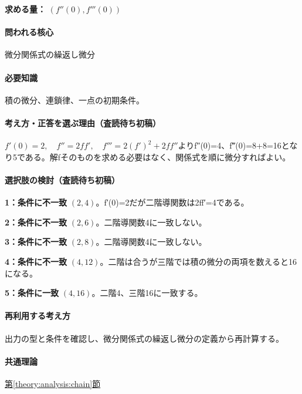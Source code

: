 \noindent\textbf{求める量：} \((f''(0),f'''(0))\)\par

\paragraph{問われる核心} 微分関係式の繰返し微分

\paragraph{必要知識} 積の微分、連鎖律、一点の初期条件。

\paragraph{考え方・正答を選ぶ理由（査読待ち初稿）} \(f'(0)=2,\quad f''=2ff',\quad f'''=2(f')^2+2ff''\)よりf″(0)=\allowbreak{}4、f‴(0)=\allowbreak{}8+8=\allowbreak{}16となり5である。解fそのものを求める必要はなく、関係式を順に微分すればよい。

\paragraph{選択肢の検討（査読待ち初稿）}\mbox{}\par

\noindent\textbf{1：条件に不一致} \((2,4)\)。f′(0)=\allowbreak{}2だが二階導関数は2ff′=4である。\par

\noindent\textbf{2：条件に不一致} \((2,6)\)。二階導関数4に一致しない。\par

\noindent\textbf{3：条件に不一致} \((2,8)\)。二階導関数4に一致しない。\par

\noindent\textbf{4：条件に不一致} \((4,12)\)。二階は合うが三階では積の微分の両項を数えると16になる。\par

\noindent\textbf{5：条件に一致} \((4,16)\)。二階4、三階16に一致する。\par

\paragraph{再利用する考え方} 出力の型と条件を確認し、微分関係式の繰返し微分の定義から再計算する。

\paragraph{共通理論} \hyperref[theory:analysis:chain]{第\ref*{theory:analysis:chain}節}

